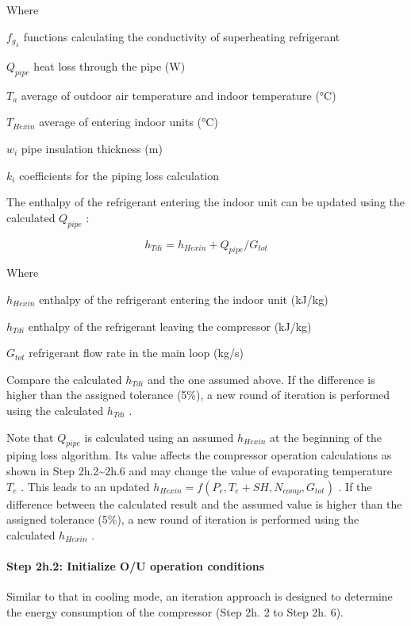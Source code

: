 Where

\(f_{g_\lambda}\) functions calculating the conductivity of superheating refrigerant

\(Q_{pipe}\) heat loss through the pipe (W)

\(T_a\) average of outdoor air temperature and indoor temperature (°C)

\(T_{Hexin}\) average of entering indoor units (°C)

\(w_i\) pipe insulation thickness (m)

\(k_i\) coefficients for the piping loss calculation

The enthalpy of the refrigerant entering the indoor unit can be updated using the calculated \(Q_{pipe}\) :

\begin{equation}
h_{Tdi} = h_{Hexin}+Q_{pipe}/G_{tot}
\end{equation}

Where

\(h_{Hexin}\) enthalpy of the refrigerant entering the indoor unit (kJ/kg)

\(h_{Tdi}\) enthalpy of the refrigerant leaving the compressor (kJ/kg)

\(G_{tot}\) refrigerant flow rate in the main loop (kg/s)

Compare the calculated \(h_{Tdi}\) and the one assumed above. If the difference is higher than the assigned tolerance (5\%), a new round of iteration is performed using the calculated \(h_{Tdi}\) .

Note that \(Q_{pipe}\) is calculated using an assumed \(h_{Hexin}\) at the beginning of the piping loss algorithm. Its value affects the compressor operation calculations as shown in Step 2h.2\textasciitilde{}2h.6 and may change the value of evaporating temperature \(T_e\) . This leads to an updated \(h_{Hexin} = f(P_e,T_e+SH,N_{comp},G_{tot})\) . If the difference between the calculated result and the assumed value is higher than the assigned tolerance (5\%), a new round of iteration is performed using the calculated \(h_{Hexin}\) .

\paragraph{Step 2h.2: Initialize O/U operation conditions}\label{step-2h.2-initialize-ou-operation-conditions}

Similar to that in cooling mode, an iteration approach is designed to determine the energy consumption of the compressor (Step 2h. 2 to Step 2h. 6).

